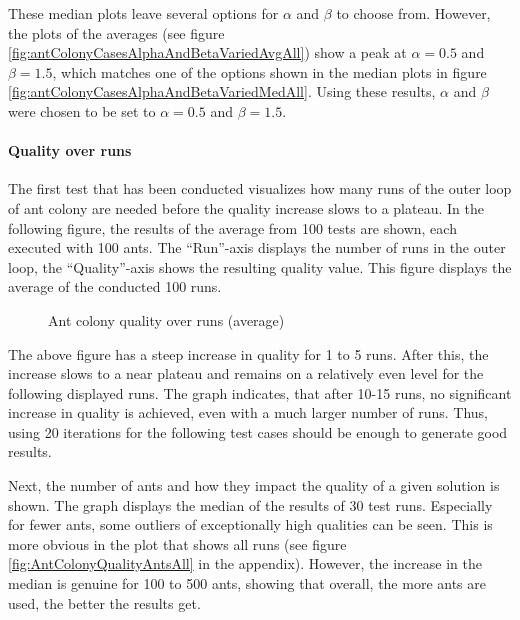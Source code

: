 These median plots leave several options for $\alpha$ and $\beta$ to choose from. 
However, the plots of the averages (see figure \ref{fig:antColonyCasesAlphaAndBetaVariedAvgAll}) show a peak at $\alpha = 0.5$ and $\beta = 1.5$, which matches one of the options shown in the median plots in figure \ref{fig:antColonyCasesAlphaAndBetaVariedMedAll}.
Using these results, $\alpha$ and $\beta$ were chosen to be set to $\alpha = 0.5$ and $\beta = 1.5$.

\paragraph{Quality over runs}

The first test that has been conducted visualizes how many runs of the outer loop of ant colony are needed before the quality increase slows to a plateau. 
In the following figure, the results of the average from 100 tests are shown, each executed with 100 ants. 
The \enquote{Run}-axis displays the number of runs in the outer loop, the \enquote{Quality}-axis shows the resulting quality value.
This figure displays the average of the conducted 100 runs.


\begin{figure}[H]
	\centering
	
	\caption{Ant colony quality over runs (average)}
	\label{fig:AntColonyQualityRuns}
\end{figure}

%	

The above figure has a steep increase in quality for 1 to 5 runs.
After this, the increase slows to a near plateau and remains on a relatively even level for the following displayed runs. 
The graph indicates, that after 10-15 runs, no significant increase in quality is achieved, even with a much larger number of runs. 
Thus, using 20 iterations for the following test cases should be enough to generate good results.


Next, the number of ants and how they impact the quality of a given solution is shown. 
The graph displays the median of the results of 30 test runs.
Especially for fewer ants, some outliers of exceptionally high qualities can be seen. 
This is more obvious in the plot that shows all runs (see figure \ref{fig:AntColonyQualityAntsAll} in the appendix).
However, the increase in the median is genuine for 100 to 500 ants, showing that overall, the more ants are used, the better the results get.

